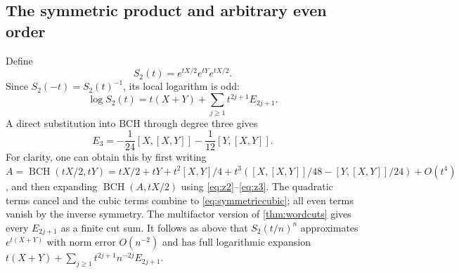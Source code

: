 \documentclass[11pt]{article}
\numberwithin{equation}{section}
\theoremstyle{definition}
\theoremstyle{remark}
\DeclareMathOperator{\BCH}{BCH}
\begin{document}
\subsection{The symmetric product and arbitrary even order}
Define
\begin{equation}\label{eq:S2}
 S_2(t)=e^{tX/2}e^{tY}e^{tX/2}.
\end{equation}
Since $S_2(-t)=S_2(t)^{-1}$, its local logarithm is odd:
\begin{equation}\label{eq:symmetriclog}
 \log S_2(t)=t(X+Y)+\sum_{j\geq1}t^{2j+1}E_{2j+1}.
\end{equation}
A direct substitution into BCH through degree three gives
\begin{equation}\label{eq:symmetriccubic}
 E_3=-\frac1{24}[X,[X,Y]]-\frac1{12}[Y,[X,Y]].
\end{equation}
For clarity, one can obtain this by first writing
$A=\BCH(tX/2,tY)=tX/2+tY+t^2[X,Y]/4+
 t^3([X,[X,Y]]/48-[Y,[X,Y]]/24)+O(t^4)$,
and then expanding $\BCH(A,tX/2)$ using
\eqref{eq:z2}--\eqref{eq:z3}. The quadratic terms cancel and the
cubic terms combine to \eqref{eq:symmetriccubic}; all even terms
vanish by the inverse symmetry. The multifactor version of
\cref{thm:wordcuts} gives every $E_{2j+1}$ as a finite cut sum.
It follows as above that $S_2(t/n)^n$ approximates $e^{t(X+Y)}$
with norm error $O(n^{-2})$ and has full logarithmic expansion
$t(X+Y)+\sum_{j\geq1}t^{2j+1}n^{-2j}E_{2j+1}$.
\end{document}
